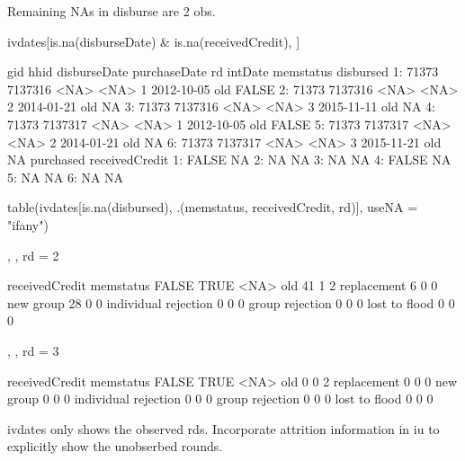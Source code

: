 Remaining NAs in disburse are 2 obs. %
\begin{Schunk}
\begin{Sinput}
ivdates[is.na(disburseDate) & is.na(receivedCredit), ]
\end{Sinput}
\begin{Soutput}
     gid    hhid disburseDate purchaseDate rd    intDate memstatus disbursed
1: 71373 7137316         <NA>         <NA>  1 2012-10-05       old     FALSE
2: 71373 7137316         <NA>         <NA>  2 2014-01-21       old        NA
3: 71373 7137316         <NA>         <NA>  3 2015-11-11       old        NA
4: 71373 7137317         <NA>         <NA>  1 2012-10-05       old     FALSE
5: 71373 7137317         <NA>         <NA>  2 2014-01-21       old        NA
6: 71373 7137317         <NA>         <NA>  3 2015-11-21       old        NA
   purchased receivedCredit
1:     FALSE             NA
2:        NA             NA
3:        NA             NA
4:     FALSE             NA
5:        NA             NA
6:        NA             NA
\end{Soutput}
\end{Schunk}
\begin{Schunk}
\begin{Sinput}
table(ivdates[is.na(disbursed), .(memstatus, receivedCredit, rd)], useNA = "ifany")
\end{Sinput}
\begin{Soutput}
, , rd = 2

                      receivedCredit
memstatus              FALSE TRUE <NA>
  old                     41    1    2
  replacement              6    0    0
  new group               28    0    0
  individual rejection     0    0    0
  group rejection          0    0    0
  lost to flood            0    0    0

, , rd = 3

                      receivedCredit
memstatus              FALSE TRUE <NA>
  old                      0    0    2
  replacement              0    0    0
  new group                0    0    0
  individual rejection     0    0    0
  group rejection          0    0    0
  lost to flood            0    0    0
\end{Soutput}
\end{Schunk}
\textsf{ivdates} only shows the observed rds. Incorporate attrition information in \textsf{iu} to explicitly show the unobserbed rounds.
